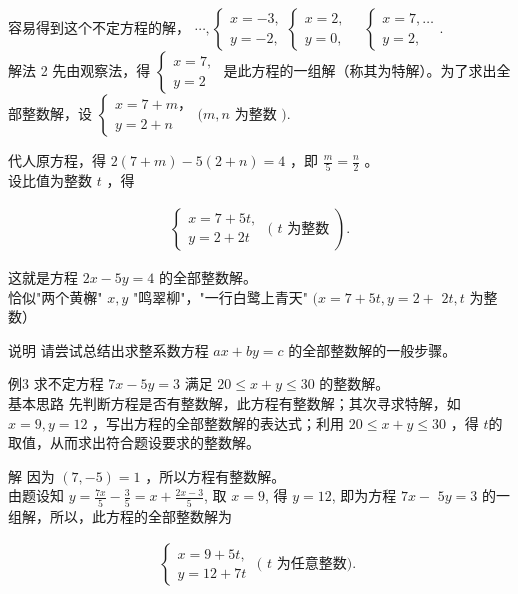\documentclass[10pt]{article}
\begin{document}
容易得到这个不定方程的解， $\cdots,\left\{\begin{array}{l}x=-3, \\ y=-2,\end{array}\left\{\begin{array}{l}x=2, \\ y=0,\end{array} \quad\left\{\begin{array}{l}x=7, \ldots \\ y=2,\end{array}\right.\right.\right.$.\\
解法 2 先由观察法，得 $\left\{\begin{array}{l}x=7, \\ y=2\end{array}\right.$ 是此方程的一组解（称其为特解）。为了求出全部整数解，设 $\left\{\begin{array}{l}x=7+m ， \\ y=2+n\end{array}(m, n\right.$ 为整数 $)$.

代人原方程，得 $2(7+m)-5(2+n)=4$ ，即 $\frac{m}{5}=\frac{n}{2}$ 。\\
设比值为整数 $t$ ，得

\begin{align*}
\left\{\begin{array}{l}
x=7+5 t, \\
y=2+2 t
\end{array} \text { ( } t \text { 为整数 }\right) .
\end{align*}

这就是方程 $2 x-5 y=4$ 的全部整数解。\\
恰似"两个黄檞" $x, y$ "鸣翠柳"，"一行白鹭上青天" $(x=7+5 t, y=2+$ $2 t, t$ 为整数）

说明 请尝试总结出求整系数方程 $a x+b y=c$ 的全部整数解的一般步骤。

例3 求不定方程 $7 x-5 y=3$ 满足 $20 \leqslant x+y \leqslant 30$ 的整数解。\\
基本思路 先判断方程是否有整数解，此方程有整数解；其次寻求特解，如 $x=9, y=12$ ，写出方程的全部整数解的表达式；利用 $20 \leqslant x+y \leqslant 30$ ，得 $t$的取值，从而求出符合题设要求的整数解。

解 因为 $(7,-5)=1$ ，所以方程有整数解。\\
由题设知 $y=\frac{7 x}{5}-\frac{3}{5}=x+\frac{2 x-3}{5}$, 取 $x=9$, 得 $y=12$, 即为方程 $7 x-$ $5 y=3$ 的一组解，所以，此方程的全部整数解为

\begin{align*}
\left\{\begin{array}{l}
x=9+5 t, \\
y=12+7 t
\end{array} \text { ( } t\right. \text { 为任意整数). }
\end{align*}
\end{document}
